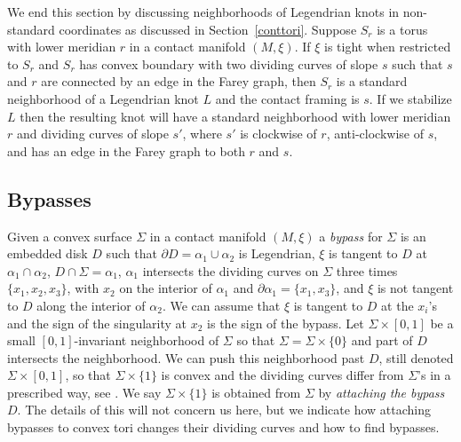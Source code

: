 \documentclass[11pt]{amsart}
\theoremstyle{plain}
\theoremstyle{definition}
\theoremstyle{remark}
\numberwithin{theorem}{section}
\newcommand{\dfn}[1]{{\em #1}}        %
\begin{document}
We end this section by discussing neighborhoods of Legendrian knots in non-standard coordinates as discussed in Section~\ref{conttori}. Suppose $S_r$ is a torus with lower meridian $r$ in a contact manifold $(M,\xi)$. If $\xi$ is tight when restricted to $S_r$ and $S_r$ has convex boundary with two dividing curves of slope $s$ such that $s$ and $r$ are connected by an edge in the Farey graph, then $S_r$ is a standard neighborhood of a Legendrian knot $L$ and the contact framing is $s$. If we stabilize $L$ then the resulting knot will have a standard neighborhood with lower meridian $r$ and dividing curves of slope $s'$, where $s'$ is clockwise of $r$, anti-clockwise of $s$, and has an edge in the Farey graph to both $r$ and $s$. 


\subsection{Bypasses}
Given a convex surface $\Sigma$ in a contact manifold $(M,\xi)$ a \dfn{bypass} for $\Sigma$ is an embedded disk $D$ such that $\partial D=\alpha_1\cup \alpha_2$ is Legendrian, $\xi$ is tangent to $D$ at $\alpha_1\cap \alpha_2$, $D\cap \Sigma=\alpha_1$, $\alpha_1$ intersects the dividing curves on $\Sigma$ three times $\{x_1,x_2,x_3\}$, with $x_2$ on the interior of $\alpha_1$ and $\partial \alpha_1=\{x_1,x_3\}$, and $\xi$ is not tangent to $D$ along the interior of $\alpha_2$. We can assume that $\xi$ is tangent to $D$ at the $x_i$'s and the sign of the singularity at $x_2$ is the sign of the bypass. Let $\Sigma\times [0,1]$ be a small $[0,1]$-invariant neighborhood of $\Sigma$ so that $\Sigma=\Sigma\times \{0\}$ and part of $D$ intersects the neighborhood. We can push this neighborhood past $D$, still denoted $\Sigma \times [0,1]$, so that $\Sigma\times \{1\}$ is convex and the dividing curves differ from $\Sigma$'s in a prescribed way, see \cite{Honda00a}. We say $\Sigma\times \{1\}$ is obtained from $\Sigma$ by \dfn{attaching the bypass $D$}.  The details of this will not concern us here, but we indicate how attaching bypasses to convex tori changes their dividing curves and how to find bypasses. 
\end{document}
